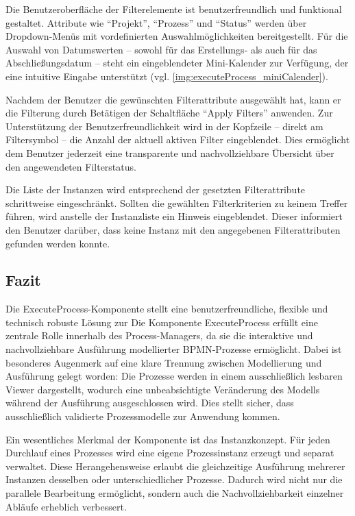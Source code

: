 Die Benutzeroberfläche der Filterelemente ist benutzerfreundlich und funktional gestaltet. Attribute wie \enquote{Projekt}, \enquote{Prozess} und \enquote{Status} werden über Dropdown-Menüs mit vordefinierten Auswahlmöglichkeiten bereitgestellt. Für die Auswahl von Datumswerten – sowohl für das Erstellungs- als auch für das Abschließungsdatum – steht ein eingeblendeter Mini-Kalender zur Verfügung, der eine intuitive Eingabe unterstützt (vgl. \autoref{img:executeProcess_miniCalender}).



Nachdem der Benutzer die gewünschten Filterattribute ausgewählt hat, kann er die Filterung durch Betätigen der Schaltfläche \enquote{Apply Filters} anwenden. Zur Unterstützung der Benutzerfreundlichkeit wird in der Kopfzeile – direkt am Filtersymbol – die Anzahl der aktuell aktiven Filter eingeblendet. Dies ermöglicht dem Benutzer jederzeit eine transparente und nachvollziehbare Übersicht über den angewendeten Filterstatus.


Die Liste der Instanzen wird entsprechend der gesetzten Filterattribute schrittweise eingeschränkt. Sollten die gewählten Filterkriterien zu keinem Treffer führen, wird anstelle der Instanzliste ein Hinweis eingeblendet. Dieser informiert den Benutzer darüber, dass keine Instanz mit den angegebenen Filterattributen gefunden werden konnte.


\newpage
\subsection*{Fazit}
Die ExecuteProcess-Komponente stellt eine benutzerfreundliche, flexible und technisch robuste Lösung zur Die Komponente ExecuteProcess erfüllt eine zentrale Rolle innerhalb des Process-Managers, da sie die interaktive und nachvollziehbare Ausführung modellierter BPMN-Prozesse ermöglicht. Dabei ist besonderes Augenmerk auf eine klare Trennung zwischen Modellierung und Ausführung gelegt worden: Die Prozesse werden in einem ausschließlich lesbaren Viewer dargestellt, wodurch eine unbeabsichtigte Veränderung des Modells während der Ausführung ausgeschlossen wird. Dies stellt sicher, dass ausschließlich validierte Prozessmodelle zur Anwendung kommen.

Ein wesentliches Merkmal der Komponente ist das Instanzkonzept. Für jeden Durchlauf eines Prozesses wird eine eigene Prozessinstanz erzeugt und separat verwaltet. Diese Herangehensweise erlaubt die gleichzeitige Ausführung mehrerer Instanzen desselben oder unterschiedlicher Prozesse. Dadurch wird nicht nur die parallele Bearbeitung ermöglicht, sondern auch die Nachvollziehbarkeit einzelner Abläufe erheblich verbessert.

